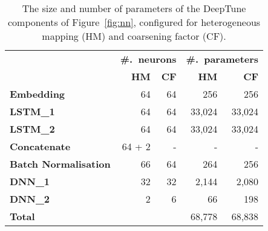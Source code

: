 \begin{table}
  \centering
  \begin{tabular}{| l r r | r r |}
    \hline
    \rowcolor{gray!50}
    & \multicolumn{2}{c}{\textbf{\#.\ neurons}} & \multicolumn{2}{c}{\textbf{\#.\ parameters}} \\
    \rowcolor{gray!50}
    & \textbf{HM} & \textbf{CF} & \textbf{HM} & \textbf{CF} \\
    \hline
    \textbf{Embedding} & 64 & 64 & 256 & 256 \\
    \textbf{LSTM\_1} & 64 & 64 & 33,024 & 33,024 \\
    \textbf{LSTM\_2} & 64 & 64 & 33,024 & 33,024 \\
    \textbf{Concatenate} & 64 + 2 & - & - & - \\
    \textbf{Batch Normalisation} & 66 & 64 & 264 & 256 \\
    \textbf{DNN\_1} & 32 & 32 & 2,144 & 2,080 \\
    \textbf{DNN\_2} & 2 & 6 & 66 & 198 \\
    \hline
    \textbf{Total} & & & 68,778 & 68,838 \\
    \hline
  \end{tabular}
  \caption[DeepTune model parameters]{%
    The size and number of parameters of the DeepTune components of
    Figure~\ref{fig:nn}, configured for heterogeneous mapping (HM) and
    coarsening factor (CF).%
  }
  \label{tab:nn-size}
\end{table}

